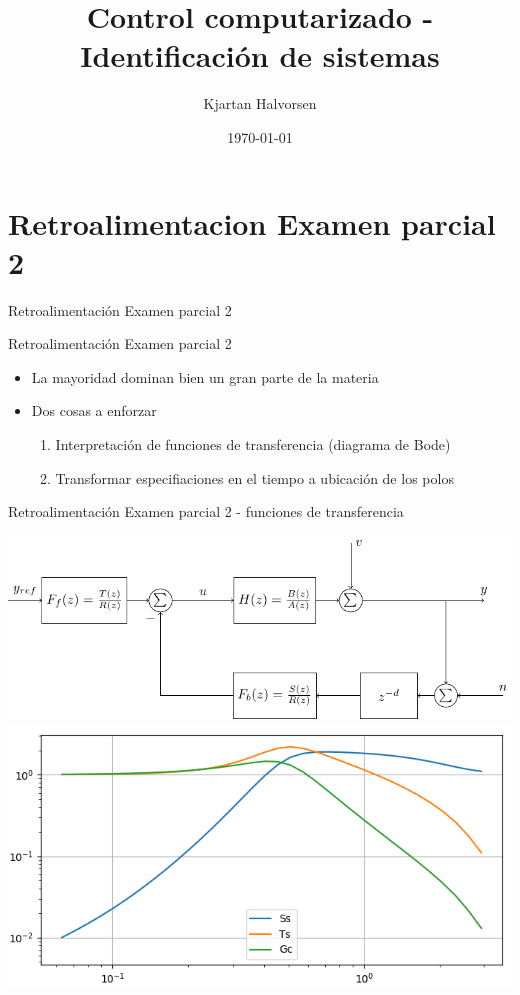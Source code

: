 \documentclass[presentation,aspectratio=169]{beamer}
\author{Kjartan Halvorsen}
\date{\today}
\title{Control computarizado - Identificación de sistemas}
\begin{document}
\maketitle

\section{Retroalimentacion Examen parcial 2}
\label{sec:org81eb63f}

\begin{frame}[label={sec:org1f304a2}]{Retroalimentación Examen parcial 2}
\end{frame}

\begin{frame}[label={sec:orgca261a3}]{Retroalimentación Examen parcial 2}
\begin{itemize}
\item La mayoridad dominan bien un gran parte de la materia
\item Dos cosas a enforzar
\begin{enumerate}
\item Interpretación de funciones de transferencia (diagrama de Bode)
\item Transformar especifiaciones en el tiempo a ubicación de los polos
\end{enumerate}
\end{itemize}
\end{frame}

\begin{frame}[label={sec:orga4c8060}]{Retroalimentación Examen parcial 2 - funciones de transferencia}
\begin{center}
\includegraphics[width=0.6\linewidth]{../../figures/2dof-block-explicit}\\
\includegraphics[width=0.6\linewidth]{../../figures/sensitivity-fcn-bode-example.png}
\end{center}
\end{frame}
\end{document}

